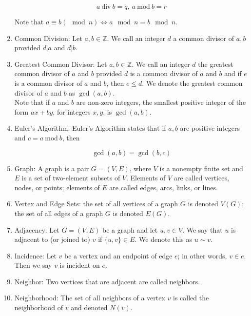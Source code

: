\documentclass{article}
\begin{document}
\begin{enumerate}
		\[a \:\text{div}\:b=q,\: a \:\text{mod}\: b=r\]
		
		Note that $a\equiv b (\mod n) \Longleftrightarrow a\mod n=b\mod n$.
		
		\item Common Division: Let $a,b\in\mathbb{Z}$.
		We call an integer $d$ a common divisor of $a,b$ provided $d|a$ and $d|b$.
		
		\item Greatest Common Divisor: Let $a,b\in\mathbb{Z}$.
		We call an integer $d$ the greatest common divisor of $a$ and $b$ provided $d$ is a common divisor of $a$ and $b$ and if $e$ is a common divisor of $a$ and $b$, then $e\leq d$.
		We denote the greatest common divisor of $a$ and $b$ as $\gcd(a,b)$.\\
		
		Note that if $a$ and $b$ are non-zero integers, the smallest positive integer of the form $ax+by$, for integers $x,y$, is $\gcd(a,b)$.
		
		\item Euler's Algorithm: Euler's Algorithm states that if $a,b$ are positive integers and $c=a\: \text{mod} \: b$, then
		
		\[\gcd(a,b)=\gcd(b, c)\]
		
		\item Graph: A graph is a pair $G=(V,E)$, where $V$ is a nonempty finite set and $E$ is a set of two-element subsets of $V$.
		Elements of $V$ are called vertices, nodes, or points;
		elements of $E$ are called edges, arcs, links, or lines.
		
		\item Vertex and Edge Sets: the set of all vertices of a graph $G$ is denoted $V(G)$; the set of all edges of a graph $G$ is denoted $E(G)$.
		
		\item Adjacency: Let $G=(V,E)$ be a graph and let $u,v\in V$.
		We say that $u$ is adjacent to (or joined to) $v$ if $\{u,v\}\in E$.
		We denote this as $u\sim v$.
		
		\item Incidence: Let $v$ be a vertex and an endpoint of edge $e$; in other words, $v\in e$.
		Then we say $v$ is incident on $e$.
		
		\item Neighbor: Two vertices that are adjacent are called neighbors.
		
		\item Neighborhood: The set of all neighbors of a vertex $v$ is called the neighborhood of $v$ and denoted $N(v)$.
		

\end{enumerate}
\end{document}
